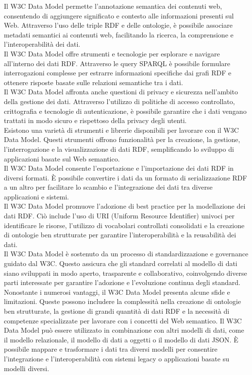 Il W3C Data Model permette l'annotazione semantica dei contenuti web, consentendo di aggiungere significato e contesto alle informazioni presenti sul Web. Attraverso l'uso delle triple RDF e delle ontologie, è possibile associare metadati semantici ai contenuti web, facilitando la ricerca, la comprensione e l'interoperabilità dei dati.\\
Il W3C Data Model offre strumenti e tecnologie per esplorare e navigare all'interno dei dati RDF. Attraverso le query SPARQL è possibile formulare interrogazioni complesse per estrarre informazioni specifiche dai grafi RDF e ottenere risposte basate sulle relazioni semantiche tra i dati.\\
Il W3C Data Model affronta anche questioni di privacy e sicurezza nell'ambito della gestione dei dati. Attraverso l'utilizzo di politiche di accesso controllato, crittografia e tecnologie di autenticazione, è possibile garantire che i dati vengano trattati in modo sicuro e rispettoso della privacy degli utenti.\\
Esistono una varietà di strumenti e librerie disponibili per lavorare con il W3C Data Model. Questi strumenti offrono funzionalità per la creazione, la gestione, l'interrogazione e la visualizzazione di dati RDF, semplificando lo sviluppo di applicazioni basate sul Web semantico. \\

Il W3C Data Model consente l'esportazione e l'importazione dei dati RDF in diversi formati. È possibile convertire i dati da un formato di serializzazione RDF a un altro per facilitare lo scambio e l'integrazione dei dati tra diverse applicazioni e sistemi.\\
Il W3C Data Model promuove l'adozione di best practice per la modellazione dei dati RDF. Ciò include l'uso di URI (Uniform Resource Identifier) univoci per identificare le risorse, l'utilizzo di vocabolari controllati consolidati e la creazione di ontologie ben strutturate per garantire l'interoperabilità e la reusabilità dei dati.\\
Il W3C Data Model è sostenuto da un processo di standardizzazione e governance guidato dal W3C. Questo assicura che gli standard correlati al modello di dati siano sviluppati in modo aperto, trasparente e collaborativo, coinvolgendo diverse parti interessate per garantire l'adozione e l'evoluzione continua degli standard.\\

Nonostante i numerosi vantaggi, il W3C Data Model presenta alcune sfide e limitazioni. Queste possono includere la complessità nella creazione di ontologie ben strutturate, la gestione di grandi quantità di dati RDF e la necessità di competenze specializzate per lavorare con i concetti del Web semantico.
Il W3C Data Model può essere utilizzato in combinazione con altri modelli di dati, come il modello relazionale, il modello di dati a oggetti o il modello di dati JSON. È possibile mappare e trasformare i dati tra diversi modelli per consentire l'integrazione e l'interoperabilità con sistemi legacy o applicazioni basate su modelli diversi.\\

